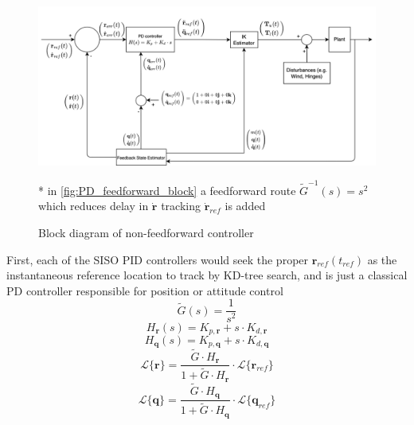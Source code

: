 \documentclass[10pt]{elsarticle}
\newcommand\fnote[1]{\captionsetup{width=.9\linewidth,font=footnotesize}\caption*{#1}}
\begin{document}
\begin{figure}[ht] 
    \centering
    \includegraphics[width=.95\textwidth]{PD_block}
    \vspace*{2mm}
    \fnote{* in \cref{fig:PD_feedforward_block} a feedforward route $\tilde{G}^{-1}(s) = s^2$ which reduces delay in $\dot{\boldsymbol{r}}$ tracking $\dot{\boldsymbol{r}}_{ref}$\cite{visioli2004new} is added}
    \vspace*{5mm}
    \caption{Block diagram of non-feedforward controller}
    \label{fig:PD_block}
\end{figure}

First, each of the SISO PID controllers would seek the proper $\boldsymbol{r}_{ref}(t_{ref})$ as the instantaneous reference location to track by KD-tree search\cite{maneewongvatana1999analysis}, and is just a classical PD controller responsible for position or attitude control 
\begin{equation} \label{eqs:Gtilde}
\tilde{G}(s) = \frac{1}{s^2}
\end{equation}
\begin{equation} \label{eqs:Hr}
H_{\boldsymbol{r}}(s) = K_{p,\boldsymbol{r}} + s \cdot K_{d,\boldsymbol{r}} 
\end{equation}
\begin{equation} \label{eqs:Hquat}
H_{\boldsymbol{q}}(s) = K_{p,\boldsymbol{q}} + s \cdot K_{d,\boldsymbol{q}}
\end{equation}
\begin{equation} \label{eqs:closedlooptf1}
\mathcal{L}\{ \boldsymbol{r} \}= \frac{\tilde{G} \cdot H_{\boldsymbol{r}}}{1 + \tilde{G} \cdot H_{\boldsymbol{r}}} \cdot \mathcal{L}\{ \boldsymbol{r}_{ref} \}
\end{equation}
\begin{equation} \label{eqs:closedlooptf2}
\mathcal{L}\{ \boldsymbol{q} \}= \frac{\tilde{G} \cdot H_{\boldsymbol{q}}}{1 + \tilde{G} \cdot H_{\boldsymbol{q}}} \cdot \mathcal{L}\{ \boldsymbol{q}_{ref} \}
\end{equation}
\end{document}
